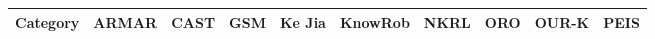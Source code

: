 \documentclass[a4paper, twocolumn]{article}
\begin{document}
\begin{landscape}
\begin{table}\tiny
\begin{center}
\begin{tabular}{p{0.2cm}p{3.4cm}p{1.6cm}p{1.3cm}p{1.7cm}p{1.5cm}p{2cm}p{2cm}p{2cm}p{1.4cm}p{1.8cm}}
\toprule
\multicolumn{2}{c}{\bf Category}                                                     & ARMAR \cite{Holzapfel2008}& CAST \cite{Hawes2007}       & GSM \cite{Mavridis2006}     & {\sc Ke Jia} \cite{Chen2010}& {\sc KnowRob} \cite{Tenorth2009a}  & NKRL \cite{Sabri2011}                           & ORO \cite{Lemaignan2010}                      & OUR-K \cite{Lim2011}          & PEIS \cite{Daoutis2009}        \\
                                                                                                                                                                                                                                                                                                                                                                                                                   
\midrule                                                                                                                                                                                                                                                                                                                                                                                                           
                                                                                                                                                                                                                                                                                                                                                                                                                   

\end{tabular}
\end{center}
\end{table}
\end{landscape}
\end{document}
